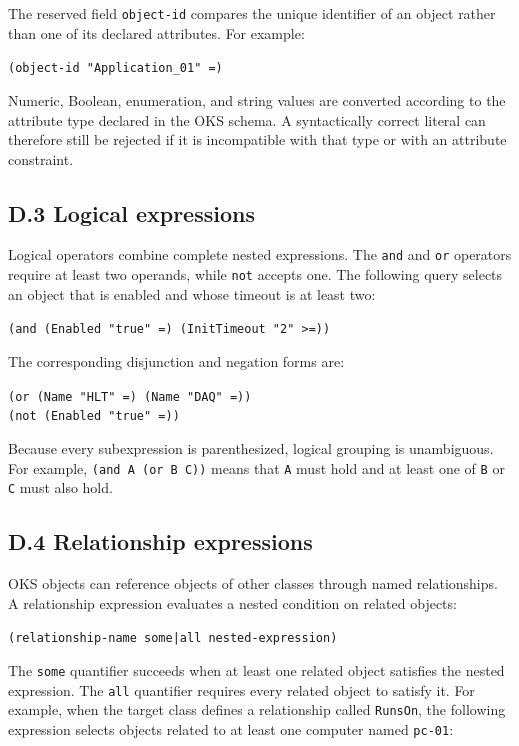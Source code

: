\documentclass[12pt, a4paper]{report}
\begin{document}
The reserved field \texttt{object-id} compares the unique identifier of an
object rather than one of its declared attributes. For example:

\begin{center}
\verb|(object-id "Application_01" =)|
\end{center}

Numeric, Boolean, enumeration, and string values are converted according to
the attribute type declared in the OKS schema. A syntactically correct literal
can therefore still be rejected if it is incompatible with that type or with
an attribute constraint.

\subsection*{D.3 Logical expressions}
Logical operators combine complete nested expressions. The \texttt{and} and
\texttt{or} operators require at least two operands, while \texttt{not} accepts
one. The following query selects an object that is enabled and whose timeout is
at least two:

\begin{center}
\verb|(and (Enabled "true" =) (InitTimeout "2" >=))|
\end{center}

The corresponding disjunction and negation forms are:

\begin{center}
\verb|(or (Name "HLT" =) (Name "DAQ" =))|\\[4pt]
\verb|(not (Enabled "true" =))|
\end{center}

Because every subexpression is parenthesized, logical grouping is unambiguous.
For example, \verb|(and A (or B C))| means that \texttt{A} must hold and at
least one of \texttt{B} or \texttt{C} must also hold.

\subsection*{D.4 Relationship expressions}
OKS objects can reference objects of other classes through named relationships.
A relationship expression evaluates a nested condition on related objects:

\begin{center}
\verb!(relationship-name some|all nested-expression)!
\end{center}

The \texttt{some} quantifier succeeds when at least one related object
satisfies the nested expression. The \texttt{all} quantifier requires every
related object to satisfy it. For example, when the target class defines a
relationship called \texttt{RunsOn}, the following expression selects objects
related to at least one computer named \texttt{pc-01}:
\end{document}
